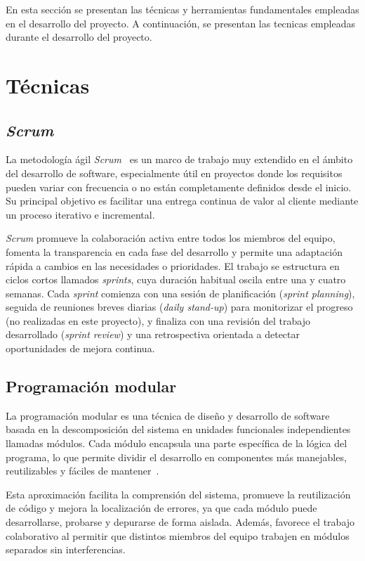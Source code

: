 
En esta sección se presentan las técnicas y herramientas fundamentales empleadas en el desarrollo del proyecto. A continuación, se presentan las tecnicas empleadas durante el desarrollo del proyecto.
\section{Técnicas}
\subsection {\textit{Scrum}}

La metodología ágil \textit{Scrum}~\cite{scrum-guide} es un marco de trabajo muy extendido en el ámbito del desarrollo de software, especialmente útil en proyectos donde los requisitos pueden variar con frecuencia o no están completamente definidos desde el inicio. Su principal objetivo es facilitar una entrega continua de valor al cliente mediante un proceso iterativo e incremental.

\textit{Scrum} promueve la colaboración activa entre todos los miembros del equipo, fomenta la transparencia en cada fase del desarrollo y permite una adaptación rápida a cambios en las necesidades o prioridades. El trabajo se estructura en ciclos cortos llamados \textit{sprints}, cuya duración habitual oscila entre una y cuatro semanas. Cada \textit{sprint} comienza con una sesión de planificación (\textit{sprint planning}), seguida de reuniones breves diarias (\textit{daily stand-up}) para monitorizar el progreso (no realizadas en este proyecto), y finaliza con una revisión del trabajo desarrollado (\textit{sprint review}) y una retrospectiva orientada a detectar oportunidades de mejora continua.

\subsection{Programación modular}
La programación modular es una técnica de diseño y desarrollo de software basada en la descomposición del sistema en unidades funcionales independientes llamadas módulos. Cada módulo encapsula una parte específica de la lógica del programa, lo que permite dividir el desarrollo en componentes más manejables, reutilizables y fáciles de mantener~\cite{pressman}.

Esta aproximación facilita la comprensión del sistema, promueve la reutilización de código y mejora la localización de errores, ya que cada módulo puede desarrollarse, probarse y depurarse de forma aislada. Además, favorece el trabajo colaborativo al permitir que distintos miembros del equipo trabajen en módulos separados sin interferencias.

